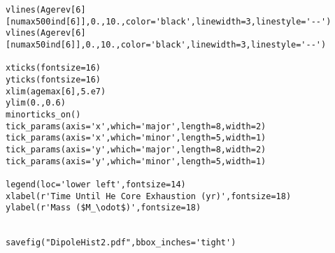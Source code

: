 \begin{verbatim}
vlines(Agerev[6][numax500ind[6]],0.,10.,color='black',linewidth=3,linestyle='--')
vlines(Agerev[6][numax50ind[6]],0.,10.,color='black',linewidth=3,linestyle='--')

xticks(fontsize=16)
yticks(fontsize=16)
xlim(agemax[6],5.e7)
ylim(0.,0.6)
minorticks_on()
tick_params(axis='x',which='major',length=8,width=2)
tick_params(axis='x',which='minor',length=5,width=1)
tick_params(axis='y',which='major',length=8,width=2)
tick_params(axis='y',which='minor',length=5,width=1)

legend(loc='lower left',fontsize=14)
xlabel(r'Time Until He Core Exhaustion (yr)',fontsize=18)
ylabel(r'Mass ($M_\odot$)',fontsize=18)


savefig("DipoleHist2.pdf",bbox_inches='tight')


\end{verbatim}
  